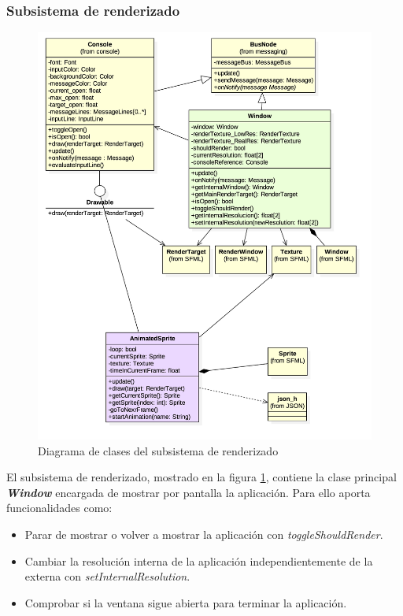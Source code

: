 \subsubsection*{Subsistema de renderizado}

\begin{figure}
	\centerline{\includegraphics[width=15cm]{otros/UML/png/alld/png/rendering__diagramaDeClases_rendering_9.png}}
	\caption{Diagrama de clases del subsistema de renderizado}
	\label{class:rendering}
\end{figure}

El subsistema de renderizado, mostrado en la figura \ref{class:rendering}, contiene la clase principal \textbf{\textit{Window}} encargada de mostrar por pantalla la aplicación. Para ello aporta funcionalidades como:

\begin{itemize}
	\item Parar de mostrar o volver a mostrar la aplicación con \textit{toggleShouldRender}.
	\item Cambiar la resolución interna de la aplicación independientemente de la externa con \textit{setInternalResolution}.
	\item Comprobar si la ventana sigue abierta para terminar la aplicación.
\end{itemize}

